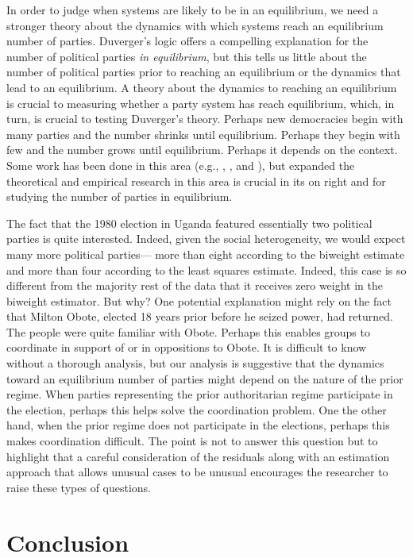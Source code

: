 \documentclass[12pt]{article}
\begin{document}
In order to judge when systems are likely to be in an equilibrium, we need a stronger theory about the dynamics with which systems reach an equilibrium number of parties. Duverger's logic offers a compelling explanation for the number of political parties \textit{in equilibrium}, but this tells us little about the number of political parties prior to reaching an equilibrium or the dynamics that lead to an equilibrium. 
A theory about the dynamics to reaching an equilibrium is crucial to measuring whether a party system has reach equilibrium, which, in turn, is crucial to testing Duverger's theory. 
Perhaps new democracies begin with many parties and the number shrinks until equilibrium. 
Perhaps they begin with few and the number grows until equilibrium. 
Perhaps it depends on the context. 
Some work has been done in this area (e.g.,  \citealt{Moser1999}, \citealt{CrispOlivelloPotter2012}, and \citealt{Ferrara2011}), but expanded the theoretical and empirical research in this area is crucial in its on right and for studying the number of parties in equilibrium. 

The fact that the 1980 election in Uganda featured essentially two political parties is quite interested. 
Indeed, given the social heterogeneity, we would expect many more political parties--- more than eight according to the biweight estimate and more than four according to the least squares estimate. 
Indeed, this case is so different from the majority rest of the data that it receives zero weight in the biweight estimator. 
But why? 
One potential explanation might rely on the fact that Milton Obote, elected 18 years prior before he seized power, had returned. 
The people were quite familiar with Obote. 
Perhaps this enables groups to coordinate in support of or in oppositions to Obote. 
It is difficult to know without a thorough analysis, but our analysis is suggestive that the dynamics toward an equilibrium number of parties might depend on the nature of the prior regime. 
When parties representing the prior authoritarian regime participate in the election, perhaps this helps solve the coordination problem. 
One the other hand, when the prior regime does not participate in the elections, perhaps this makes coordination difficult. 
The point is not to answer this question but to highlight that a careful consideration of the residuals along with an estimation approach that allows unusual cases to be unusual encourages the researcher to raise these types of questions.

\section*{Conclusion}
\end{document}

